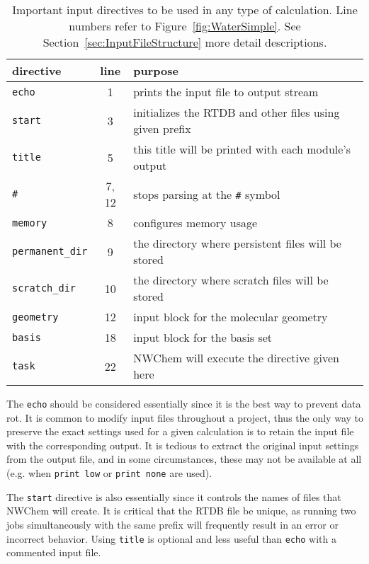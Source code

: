 \documentclass[letterpaper,12pt]{article}
\begin{document}
\begin{table}[!hp]
    \label{tab:BasicInput}
    \caption{Important input directives to be used in any type of calculation.  Line numbers refer to Figure~\ref{fig:WaterSimple}.  See Section~\ref{sec:InputFileStructure} more detail descriptions.}
    \begin{tabular}{lcl}
        \hline\hline
        directive               & line  & purpose \\
        \hline
        \texttt{echo}           & 1     & prints the input file to output stream \\
        \texttt{start}          & 3     & initializes the RTDB and other files using given prefix \\
        \texttt{title}          & 5     & this title will be printed with each module's output \\
        \texttt{\#}             & 7, 12 & stops parsing at the \texttt{\#} symbol \\
        \texttt{memory}         & 8     & configures memory usage \\
        \texttt{permanent\_dir} & 9     & the directory where persistent files will be stored \\
        \texttt{scratch\_dir}   & 10    & the directory where scratch files will be stored \\
        \texttt{geometry}       & 12    & input block for the molecular geometry \\
        \texttt{basis}          & 18    & input block for the basis set \\
        \texttt{task}           & 22    & NWChem will execute the directive given here \\
        \hline\hline
    \end{tabular}
\end{table}

The \texttt{echo} should be considered essentially since it is the best way to prevent data rot.  It is common to modify input files throughout a project, thus the only way to preserve the exact settings used for a given calculation is to retain the input file with the corresponding output.  It is tedious to extract the original input settings from the output file, and in some circumstances, these may not be available at all (e.g. when \texttt{print low} or \texttt{print none} are used).

The \texttt{start} directive is also essentially since it controls the names of files that NWChem will create.  It is critical that the RTDB file be unique, as running two jobs simultaneously with the same prefix will frequently result in an error or incorrect behavior.  Using \texttt{title} is optional and less useful than \texttt{echo} with a commented input file.
\end{document}
